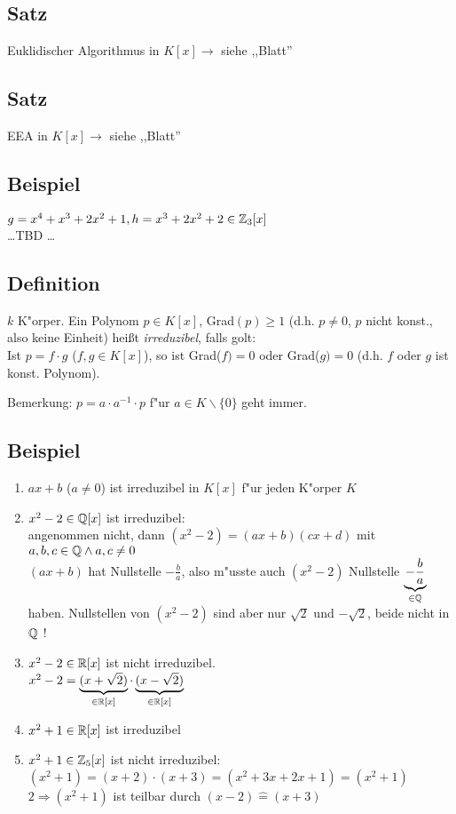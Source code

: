 
\subsection{Satz} Euklidischer Algorithmus in $K[x] \rightarrow$ siehe ,,Blatt''

\subsection{Satz} EEA in $K[x] \rightarrow$ siehe ,,Blatt''

\subsection{Beispiel}
$g=x^4+x^3 + 2x^2+1,  h= x^3+2x^2+2 \in \mathbb{Z}_3 [x]$\\
\dots TBD \dots

\subsection{Definition}
$k$ K"orper. Ein Polynom $p\in K[x]$, Grad$(p)\geq 1$ (d.h. $p\neq 0$, $p$ nicht konst., also keine Einheit) heißt \emph{irreduzibel}, falls golt: \\
Ist $p=f \cdot g$ ($f,g\in K[x]$), so ist Grad($f)= 0$ oder Grad($g)=0$ (d.h. $f$ oder $g$ ist konst. Polynom).

Bemerkung: $p= a \cdot a^{-1} \cdot p$ f"ur $a \in K \backslash \{0\}$ geht immer.

\subsection{Beispiel}
\begin{enumerate}
	\item
	$ax+b$ ($a \neq 0$) ist irreduzibel in $K[x]$ f"ur jeden K"orper $K$
	\item
	$x^2-2 \in \mathbb{Q}[x]$ ist irreduzibel:\\
	angenommen nicht, dann $(x^2-2) = (ax+b)(cx+d)$ mit $a,b,c \in \mathbb{Q} \land a,c \neq 0$\\
	$(ax+b)$ hat Nullstelle $-\frac{b}{a}$, also m"usste auch $(x^2-2)$ Nullstelle $\underbrace{-\frac{b}{a}}_{\in \mathbb{Q}}$ haben.
	Nullstellen von $(x^2-2)$ sind aber nur $\sqrt{2}$ und $-\sqrt{2}$, beide nicht in $\mathbb{Q}$ !
	\item
	$x^2-2 \in \mathbb{R}[x]$ ist nicht irreduzibel.\\
	$x^2-2 = \underbrace{(x+ \sqrt{2})}_{\in \mathbb{R}[x]} \cdot \underbrace{(x-\sqrt{2})}_{\in \mathbb{R}[x]}$
	\item
	$x^2+1 \in \mathbb{R}[x]$ ist irreduzibel
	\item
	$x^2+1 \in \mathbb{Z}_5[x]$ ist nicht irreduzibel:\\
	$(x^2 +1) = (x+2) \cdot (x+3) = (x^2 + 3x +2x +1) = (x^2+1)$\\
	$2 \Rightarrow (x^2+1)$ ist teilbar durch $(x-2) \hat{=} (x+3)$
\end{enumerate}

